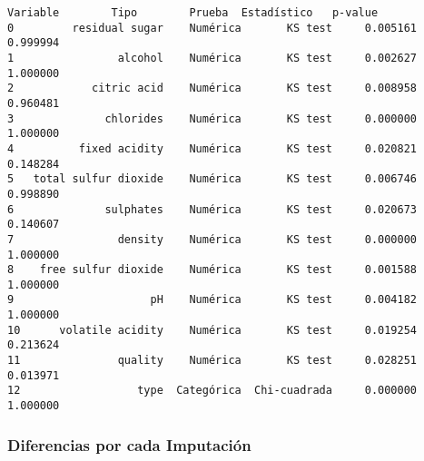 \documentclass[11pt]{article}
\begin{document}
    
    
    \begin{Verbatim}[commandchars=\\\{\}]
                Variable        Tipo        Prueba  Estadístico   p-value
0         residual sugar    Numérica       KS test     0.005161  0.999994
1                alcohol    Numérica       KS test     0.002627  1.000000
2            citric acid    Numérica       KS test     0.008958  0.960481
3              chlorides    Numérica       KS test     0.000000  1.000000
4          fixed acidity    Numérica       KS test     0.020821  0.148284
5   total sulfur dioxide    Numérica       KS test     0.006746  0.998890
6              sulphates    Numérica       KS test     0.020673  0.140607
7                density    Numérica       KS test     0.000000  1.000000
8    free sulfur dioxide    Numérica       KS test     0.001588  1.000000
9                     pH    Numérica       KS test     0.004182  1.000000
10      volatile acidity    Numérica       KS test     0.019254  0.213624
11               quality    Numérica       KS test     0.028251  0.013971
12                  type  Categórica  Chi-cuadrada     0.000000  1.000000
    \end{Verbatim}

    
    \hypertarget{diferencias-por-cada-imputaciuxf3n}{%
\subsubsection{Diferencias por cada
Imputación}\label{diferencias-por-cada-imputaciuxf3n}}
\end{document}
